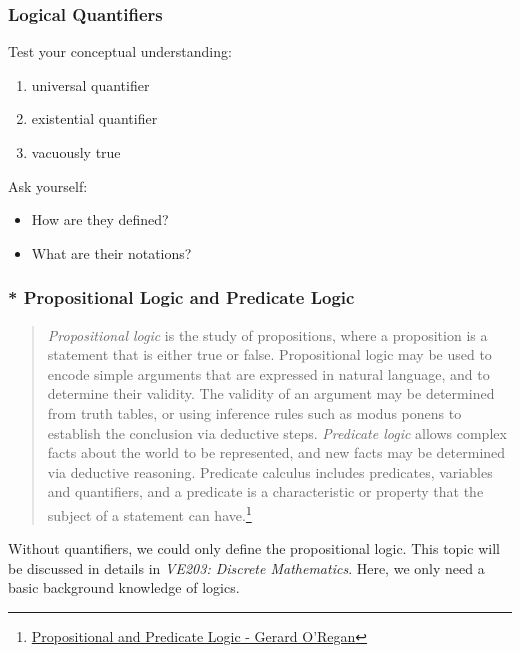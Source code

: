 \documentclass[10pt, t]{beamer}
\renewcommand{\emph}[1]{{\color{bladerunnerblue}\textsl{#1}}}
\begin{document}
\begin{frame}
    \frametitle{Logical Quantifiers}
    Test your conceptual understanding:
    \begin{enumerate}
        \item universal quantifier
        \item existential quantifier
        \item vacuously true
    \end{enumerate}
    Ask yourself:
    \begin{itemize}
        \item How are they defined?
        \item What are their notations?
    \end{itemize}
\end{frame}

\begin{frame}
    \frametitle{* Propositional Logic and Predicate Logic}
    \begin{quote}

        \emph{Propositional logic} is the study of propositions, where a proposition is a statement that is either true or false. Propositional logic may be used to encode simple arguments that are expressed in natural language, and to determine their validity. The validity of an argument may be determined from truth tables, or using inference rules such as modus ponens to establish the conclusion via deductive steps. \emph{Predicate logic} allows complex facts about the world to be represented, and new facts may be determined via deductive reasoning. Predicate calculus includes predicates, variables and quantifiers, and a predicate is a characteristic or property that the subject of a statement can have.\footnote[frame]{
            \href{https://link.springer.com/chapter/10.1007/978-3-319-64021-1_6}{Propositional and Predicate Logic - Gerard O’Regan}
        }
    \end{quote}

    Without quantifiers, we could only define the propositional logic. This topic will be discussed in details in \textit{VE203: Discrete Mathematics}. Here, we only need a basic background knowledge of logics.
\end{frame}
\end{document}
